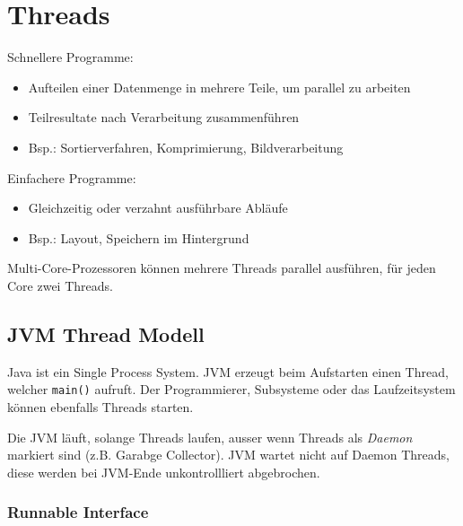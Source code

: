 \section{Threads}
Schnellere Programme:
\begin{itemize}[itemsep=0em, parsep=0pt]
    \item Aufteilen einer Datenmenge in mehrere Teile, um parallel zu arbeiten
    \item Teilresultate nach Verarbeitung zusammenführen
    \item Bsp.: Sortierverfahren, Komprimierung, Bildverarbeitung
\end{itemize}
Einfachere Programme:
\begin{itemize}[itemsep=0em, parsep=0pt]
    \item Gleichzeitig oder verzahnt ausführbare Abläufe
    \item Bsp.: Layout, Speichern im Hintergrund
\end{itemize}
Multi-Core-Prozessoren können mehrere Threads parallel ausführen, für jeden Core zwei Threads.

\subsection{JVM Thread Modell}
Java ist ein Single Process System. JVM erzeugt beim Aufstarten einen Thread, welcher \verb|main()| aufruft. Der Programmierer, Subsysteme oder das 
Laufzeitsystem können ebenfalls Threads starten.

Die JVM läuft, solange Threads laufen, ausser wenn Threads als \textit{Daemon} markiert sind (z.B. Garabge Collector). JVM wartet nicht auf Daemon Threads, 
diese werden bei JVM-Ende unkontrollliert abgebrochen.

\subsubsection{Runnable Interface}

